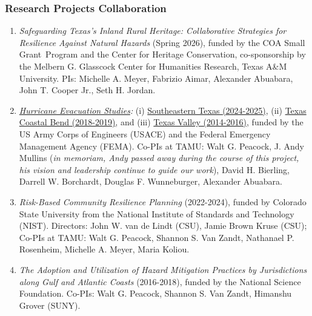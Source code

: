 \documentclass[11pt,oneside]{article}
\begin{document}
\subsubsection{Research Projects Collaboration}
\begin{enumerate}[leftmargin=40pt]
\item {\emph{Safeguarding Texas's Inland Rural Heritage: Collaborative Strategies for Resilience Against Natural Hazards}} (Spring 2026), funded by the COA Small Grant Program and the Center for Heritage Conservation, co-sponsorship by the Melbern G. Glasscock Center for Humanities Research, Texas A\&M University. PIs: Michelle A. Meyer, Fabrizio Aimar, Alexander Abuabara, John T. Cooper Jr., Seth H. Jordan.
\item \emph{\href{https://texas-planning-atlas-tamu.hub.arcgis.com}{Hurricane Evacuation Studies}:} 
(i) \href{https://texasatlas.arch.tamu.edu}{{Southeastern Texas (2024-2025)}}, 
(ii) \href{https://texas-planning-atlas-tamu.hub.arcgis.com/apps/337900395c604c3cb2cc1feeb41a9053/explore}{Texas Coastal Bend (2018-2019)}, and 
(iii) \href{https://texas-planning-atlas-tamu.hub.arcgis.com/apps/047af4b2415b442e9bb10108ab1d3eb4/explore}{Texas Valley (2014-2016)}, funded by the {US Army Corps of Engineers (USACE)} and the {Federal Emergency Management Agency (FEMA)}.  Co-PIs at TAMU: Walt G. Peacock, J. Andy Mullins (\emph{in memoriam, Andy passed away during the course of this project, his vision and leadership continue to guide our work}), David H. Bierling, Darrell W. Borchardt, Douglas F. Wunneburger, Alexander Abuabara.
\item \emph{Risk-Based Community Resilience Planning} (2022-2024), funded by Colorado State University from the National Institute of Standards and Technology (NIST). Directors: John W. van de Lindt (CSU), Jamie Brown Kruse (CSU); Co-PIs at TAMU: Walt G. Peacock, Shannon S. Van Zandt, Nathanael P. Rosenheim, Michelle A. Meyer, Maria Koliou.
\item \emph{The Adoption and Utilization of Hazard Mitigation Practices by Jurisdictions along Gulf and Atlantic Coasts} (2016-2018), funded by the National Science Foundation. Co-PIs: Walt G. Peacock, Shannon S. Van Zandt, Himanshu Grover (SUNY).
\end{enumerate}
\end{document}
